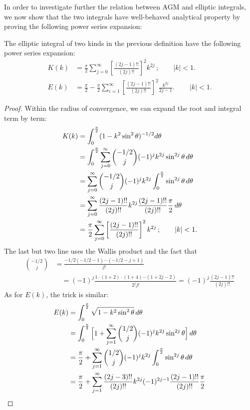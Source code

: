 \documentclass{report}
\begin{document}
\begin{titlepage}
In order to investigate further the relation between AGM and elliptic integrals, we now show that the two integrals have well-behaved analytical property by proving the following power series expansion:
\begin{T}{\rm\cite{Borwein:1987aa}}
The elliptic integral of two kinds in the previous definition have the following power series expansion:
\begin{align}
K(k)&=\frac{\pi}{2}\sum_{j=0}^{\infty}\left[\frac{(2j-1)!!}{(2j)!!}\right]^2k^{2j}\,; \qquad |k|<1.\\
 E(k)&=\frac{\pi}{2}-\frac{\pi}{2}\sum_{i=1}^{\infty}\left[\frac{(2j-1)!!}{(2j)!!}\right]^2\frac{k^{2j}}{2j-1}.\,
 \qquad |k|<1.
\end{align}
\end{T}
\begin{proof}
Within the radius of convergence, we can expand the root and integral term by term:
\begin{align*}
K(k)&=\int_0^{\pi\over 2}(1-k^2\sin^2\theta)^{-1/2}d\theta\\
&=\int_0^{\pi\over 2}\sum_{j=0}^{\infty}{-1/2\choose j}(-1)^jk^{2j}\sin^{2j}\theta\,d\theta\\
&=\sum_{j=0}^{\infty}{-1/2\choose j}(-1)^jk^{2j}\int_0^{\pi\over 2}\sin^{2j}\theta\,d\theta\\
&=\sum_{j=0}^{\infty}\frac{(2j-1)!!}{(2j)!!}k^{2j}\frac{(2j-1)!!}{(2j)!!}\frac{\pi}{2}\,d\theta\\
&=\frac{\pi}{2}\sum_{j=0}^{\infty}\left[\frac{(2j-1)!!}{(2j)!!}\right]^2k^{2j}\,; \qquad |k|<1.\\
\end{align*}
The last but two line uses the Wallis product and the fact that
\begin{align*}
{-1/2\choose j}&=\frac{-1/2(-1/2-1)\cdots(-1/2-j+1)}{j!}\\
&\quad=(-1)^j \frac{1\cdot(1+2)\cdot(1+4)\cdots(1+2j-2)}{2^jj!}=(-1)^j\frac{(2j-1)!!}{(2j)!!}
\end{align*}
As for $E(k)$, the trick is similar:
\begin{align*}
E(k)&=\int_0^{\pi\over 2}\sqrt{1-k^2\sin^2\theta}\,d\theta\\
&=\int_0^{\pi\over 2}\Big[1+\sum_{j=1}^{\infty}{1/2\choose j}(-1)^jk^{2j}\sin^{2j}\theta\Big]\,d\theta\\
&=\frac{\pi}{2}+ \sum_{j=1}^{\infty}{1/2\choose j}(-1)^jk^{2j}\int_0^{\pi\over 2}\sin^{2j}\theta\,d\theta\\
&=\frac{\pi}{2}+\sum_{j=1}^{\infty}\frac{(2j-3)!!}{(2j)!!}k^{2j}(-1)^{2j-1}\frac{(2j-1)!!}{(2j)!!}\frac{\pi}{2}\\

\end{align*}
\end{proof}
\end{titlepage}
\end{document}
